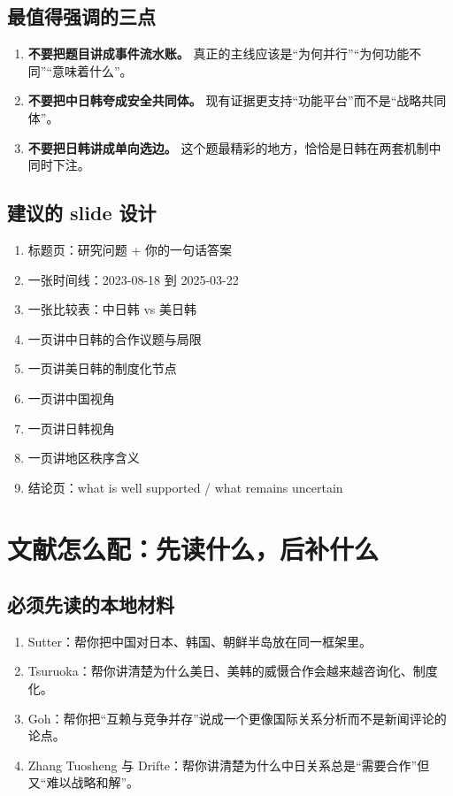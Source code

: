 \documentclass[a4paper]{article}
\begin{document}
\subsection{最值得强调的三点}

\begin{enumerate}
\item \textbf{不要把题目讲成事件流水账。} 真正的主线应该是“为何并行”“为何功能不同”“意味着什么”。
\item \textbf{不要把中日韩夸成安全共同体。} 现有证据更支持“功能平台”而不是“战略共同体”。
\item \textbf{不要把日韩讲成单向选边。} 这个题最精彩的地方，恰恰是日韩在两套机制中同时下注。
\end{enumerate}

\subsection{建议的 slide 设计}

\begin{enumerate}
\item 标题页：研究问题 + 你的一句话答案
\item 一张时间线：2023-08-18 到 2025-03-22
\item 一张比较表：中日韩 vs 美日韩
\item 一页讲中日韩的合作议题与局限
\item 一页讲美日韩的制度化节点
\item 一页讲中国视角
\item 一页讲日韩视角
\item 一页讲地区秩序含义
\item 结论页：what is well supported / what remains uncertain
\end{enumerate}

\section{文献怎么配：先读什么，后补什么}

\subsection{必须先读的本地材料}

\begin{enumerate}
\item Sutter：帮你把中国对日本、韩国、朝鲜半岛放在同一框架里。
\item Tsuruoka：帮你讲清楚为什么美日、美韩的威慑合作会越来越咨询化、制度化。
\item Goh：帮你把“互赖与竞争并存”说成一个更像国际关系分析而不是新闻评论的论点。
\item Zhang Tuosheng 与 Drifte：帮你讲清楚为什么中日关系总是“需要合作”但又“难以战略和解”。
\end{enumerate}
\end{document}

